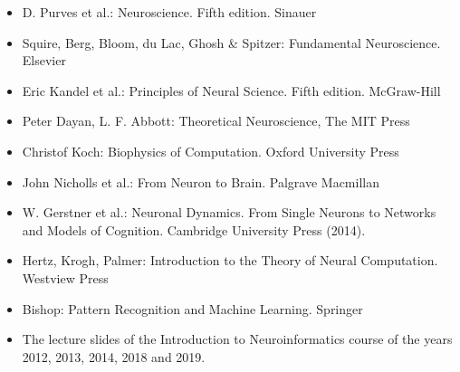 \documentclass[a4paper, 12pt]{article}
\begin{document}
\begin{itemize}
\item D. Purves et al.: Neuroscience. Fifth edition. Sinauer

\item Squire, Berg, Bloom, du Lac, Ghosh \& Spitzer: Fundamental Neuroscience. Elsevier

\item Eric Kandel et al.: Principles of Neural Science. Fifth edition.
McGraw-Hill 

\item Peter Dayan, L. F. Abbott: Theoretical Neuroscience, The MIT
Press

\item Christof Koch: Biophysics of Computation. Oxford University Press

\item John Nicholls et al.: From Neuron to Brain. Palgrave Macmillan

\item W. Gerstner et al.: Neuronal Dynamics. From Single Neurons to Networks and Models of Cognition. Cambridge University Press (2014).

\item Hertz, Krogh, Palmer: Introduction to the Theory of Neural Computation.
Westview Press

\item Bishop: Pattern Recognition and Machine Learning. Springer

\item The lecture slides of the Introduction to Neuroinformatics course of the years 2012, 2013, 2014, 2018 and 2019.

\end{itemize}
\end{document}
